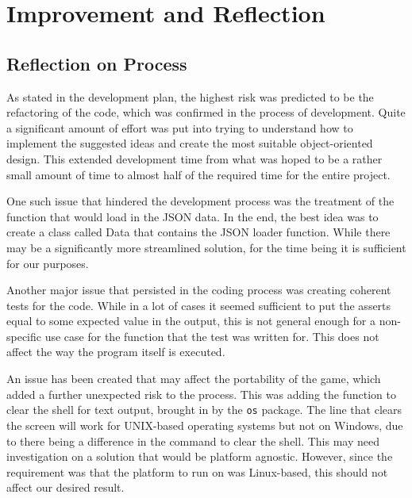 \documentclass[12pt,a4paper,tightenlines]{article}
\begin{document}
\section{Improvement and Reflection}
\subsection{Reflection on Process}
As stated in the development plan, the highest risk was predicted to be
the refactoring of the code, which was confirmed in the process
of development. Quite a significant amount of effort was put into 
trying to understand how to implement the suggested ideas and create
the most suitable object-oriented design. This extended development time
from what was hoped to be a rather small amount of time to almost
half of the required time for the entire project.

One such issue that hindered
the development process was the treatment of the function that would load
in the JSON data. In the end, the best idea was to create a class called
Data that contains the JSON loader function. While there may be a 
significantly more streamlined solution, for the time being it is
sufficient for our purposes.

Another major issue that persisted in the coding process was creating
coherent tests for the code. While in a lot of cases it seemed sufficient
to put the asserts equal to some expected value in the output, this
is not general enough for a non-specific use case for the function
that the test was written for. This does not affect the way the 
program itself is executed.

An issue has been created that may affect the portability of the game,
which added a further unexpected risk to the process. This was adding
the function to clear the shell for text output, brought in by the
\texttt{os} package. The line that clears the screen will work for 
UNIX-based operating systems but not on Windows, due to there being
a difference in the command to clear the shell. This may need 
investigation on a solution that would be platform agnostic. However,
since the requirement was that the platform to run on was Linux-based,
this should not affect our desired result.
\end{document}
